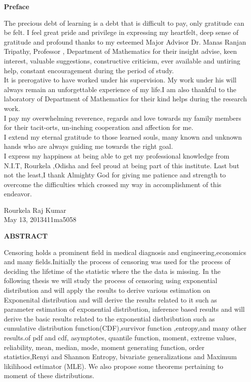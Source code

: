 \documentclass[12pt]{article}
\begin{document}
\newpage
\vspace{0.5cm}
\begin{center}
\textbf{\Large Preface}
\end{center}
The precious debt of learning is a debt that is difficult to pay, only gratitude can be felt. I feel great pride and privilege in expressing my heartfelt, deep sense of gratitude and profound thanks to my esteemed Major Advisor Dr. Manas Ranjan Tripathy, Professor , Department of Mathematics for their insight advise, keen interest, valuable suggestions, constructive criticism, ever available and untiring help, constant encouragement during the period of study.\\
It is prerogative to have worked under his supervision. My work under his will always remain an unforgettable experience of my life.I am also thankful to the laboratory of Department of Mathematics for their kind helps during the research work.\\
I pay my overwhelming reverence, regards and love towards my family members for their tacit-orts, un-inching cooperation and affection for me.\\
I extend my eternal gratitude to those learned souls, many known and unknown hands
who are always guiding me towards the right goal.\\
I express my happiness at being able to get my professional knowledge from N.I.T,
Rourkela ,Odisha and feel proud at being part of this institute. Last but not the least,I thank Almighty God for giving me patience and strength to overcome the difficulties which crossed my way in accomplishment of this endeavor.
\vspace{2cm}
\begin{flushleft}
Rourkela  \hfill Raj Kumar\\
May 13, 2013\hfill 411ma5058
\end{flushleft}




\newpage
\vspace{0.5cm}
\begin{center}
	\textbf{\Large ABSTRACT}
\end{center}
 Censoring holds a prominent field in medical diagnosis and engineering,economics and many fields.Initially the process of censoring was used for the process of deciding the lifetime of the statistic where the the data is missing. In the following thesis we will study the process of censoring using exponential distribution and will apply the results to derive various estimation on Exponenital distribution and will derive the results related to it such as parameter estimation of exponential distribution, inference based results and will derive the basic results related to the exponential distbribution such as cumulative distribution function(CDF),survivor function ,entropy,and many other results.of pdf and cdf, asymptotes, quantile function, moment, extreme
 values, reliability, mean, median, mode, moment generating function, order statistics,Renyi and Shannon Entropy, bivariate generalizations and Maximum likilihood estimator (MLE). We also propose some theorems pertaining to moment of these distributions.
\end{document}
